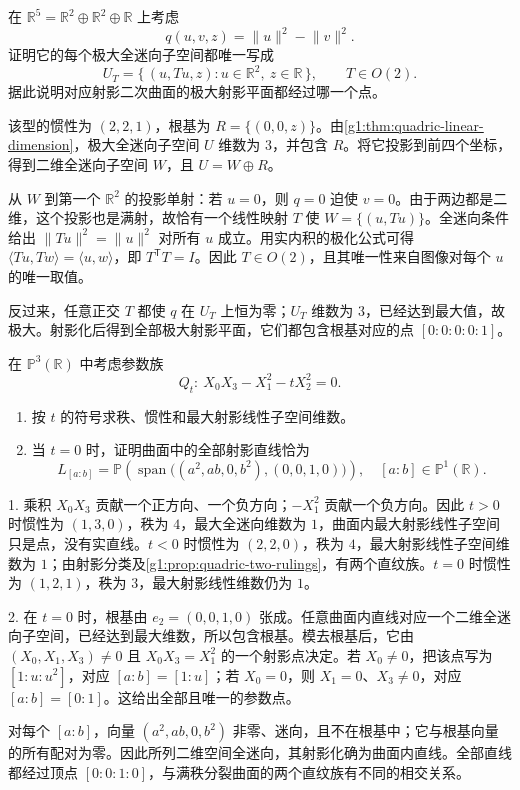 \begin{exercise}
	\label{g1:ex:isotropic-graph-orthogonal}
	在 \(\mathbb R^5=\mathbb R^2\oplus\mathbb R^2\oplus\mathbb R\) 上考虑
	\[
		q(u,v,z)=\lVert u\rVert^2-\lVert v\rVert^2.
	\]
	证明它的每个极大全迷向子空间都唯一写成
	\[
		U_T=\{\,(u,Tu,z):u\in\mathbb R^2,\ z\in\mathbb R\,\},
		\qquad T\in O(2).
	\]
	据此说明对应射影二次曲面的极大射影平面都经过哪一个点。
\end{exercise}
\begin{solution}
	该型的惯性为 \((2,2,1)\)，根基为 \(R=\{(0,0,z)\}\)。由\cref{g1:thm:quadric-linear-dimension}，极大全迷向子空间 \(U\) 维数为 \(3\)，并包含 \(R\)。将它投影到前四个坐标，得到二维全迷向子空间 \(W\)，且 \(U=W\oplus R\)。

	从 \(W\) 到第一个 \(\mathbb R^2\) 的投影单射：若 \(u=0\)，则 \(q=0\) 迫使 \(v=0\)。由于两边都是二维，这个投影也是满射，故恰有一个线性映射 \(T\) 使 \(W=\{(u,Tu)\}\)。全迷向条件给出 \(\lVert Tu\rVert^2=\lVert u\rVert^2\) 对所有 \(u\) 成立。用实内积的极化公式可得 \(\langle Tu,Tw\rangle=\langle u,w\rangle\)，即 \(T^{\mathsf T}T=I\)。因此 \(T\in O(2)\)，且其唯一性来自图像对每个 \(u\) 的唯一取值。

	反过来，任意正交 \(T\) 都使 \(q\) 在 \(U_T\) 上恒为零；\(U_T\) 维数为 \(3\)，已经达到最大值，故极大。射影化后得到全部极大射影平面，它们都包含根基对应的点 \([0:0:0:0:1]\)。
\end{solution}

\begin{exercise}
	\label{g1:ex:quadric-cone-family}
	在 \(\mathbb P^3(\mathbb R)\) 中考虑参数族
	\[
		Q_t:\ X_0X_3-X_1^2-tX_2^2=0.
	\]
	\begin{enumerate}
		\item 按 \(t\) 的符号求秩、惯性和最大射影线性子空间维数。
		\item 当 \(t=0\) 时，证明曲面中的全部射影直线恰为
		\[
			L_{[a:b]}=\mathbb P\!\left(
			\operatorname{span}\bigl((a^2,ab,0,b^2),(0,0,1,0)\bigr)\right),
			\quad [a:b]\in\mathbb P^1(\mathbb R).
		\]
	\end{enumerate}
\end{exercise}
\begin{solution}
	1. 乘积 \(X_0X_3\) 贡献一个正方向、一个负方向；\(-X_1^2\) 贡献一个负方向。因此 \(t>0\) 时惯性为 \((1,3,0)\)，秩为 \(4\)，最大全迷向维数为 \(1\)，曲面内最大射影线性子空间只是点，没有实直线。\(t<0\) 时惯性为 \((2,2,0)\)，秩为 \(4\)，最大射影线性子空间维数为 \(1\)；由射影分类及\cref{g1:prop:quadric-two-rulings}，有两个直纹族。\(t=0\) 时惯性为 \((1,2,1)\)，秩为 \(3\)，最大射影线性维数仍为 \(1\)。

	2. 在 \(t=0\) 时，根基由 \(e_2=(0,0,1,0)\) 张成。任意曲面内直线对应一个二维全迷向子空间，已经达到最大维数，所以包含根基。模去根基后，它由 \((X_0,X_1,X_3)\ne0\) 且 \(X_0X_3=X_1^2\) 的一个射影点决定。若 \(X_0\ne0\)，把该点写为 \([1:u:u^2]\)，对应 \([a:b]=[1:u]\)；若 \(X_0=0\)，则 \(X_1=0\)、\(X_3\ne0\)，对应 \([a:b]=[0:1]\)。这给出全部且唯一的参数点。

	对每个 \([a:b]\)，向量 \((a^2,ab,0,b^2)\) 非零、迷向，且不在根基中；它与根基向量的所有配对为零。因此所列二维空间全迷向，其射影化确为曲面内直线。全部直线都经过顶点 \([0:0:1:0]\)，与满秩分裂曲面的两个直纹族有不同的相交关系。
\end{solution}

